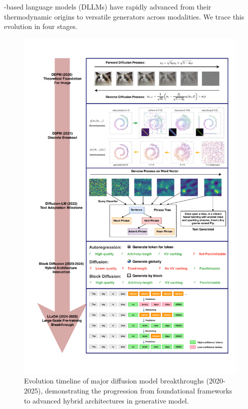 -based language models (DLLMs) have rapidly advanced from their thermodynamic origins to versatile generators across modalities. We trace this evolution in four stages.

\begin{figure}[ht!]
    \centering
    \includegraphics[width=0.95\linewidth]{figs/diffusion.pdf}
    \caption{\centering Evolution timeline of major diffusion model breakthroughs (2020-2025), demonstrating the progression from foundational frameworks to advanced hybrid architectures in generative model.}
    \label{fig:diffusion}
\end{figure}

